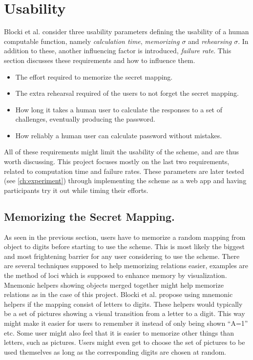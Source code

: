 \section{Usability}\label{sec:usability}
Blocki et al. \cite{hcp-blocki} consider three usability parameters defining the usability of a human computable function, namely \emph{calculation time}, \emph{memorizing $\sigma$} and \emph{rehearsing $\sigma$}. In addition to these, another influencing factor is introduced, \emph{failure rate}. This section discusses these requirements and how to influence them.
\begin{itemize}
    \item The effort required to memorize the secret mapping.
    \item The extra rehearsal required of the users to not forget the secret mapping. 
    \item How long it takes a human user to calculate the responses to a set of challenges, eventually producing the password. 
    \item How reliably a human user can calculate password without mistakes.
\end{itemize}
All of these requirements might limit the usability of the scheme, and are thus worth discussing. This project focuses mostly on the last two requirements, related to computation time and failure rates. These parameters are later tested (see \autoref{ch:experiment}) through implementing the scheme as a web app and having participants try it out while timing their efforts. 


\subsection{Memorizing the Secret Mapping.}
As seen in the previous section, users have to memorize a random mapping from object to digits before starting to use the scheme. This is most likely the biggest and most frightening barrier for any user considering to use the scheme. There are several techniques supposed to help memorizing relations easier, examples are the method of loci \cite{human-memory} which is supposed to enhance memory by visualization. Mnemonic helpers showing objects merged together might help memorize relations as in the case of this project. Blocki et al. \cite{hcp-blocki} propose using mnemonic helpers if the mapping consist of letters to digits. These helpers would typically be a set of pictures showing a visual transition from a letter to a digit. This way might make it easier for users to remember it instead of only being shown ``A=1'' etc. Some user might also feel that it is easier to memorize other things than letters, such as pictures. Users might even get to choose the set of pictures to be used themselves as long as the corresponding digits are chosen at random. 

